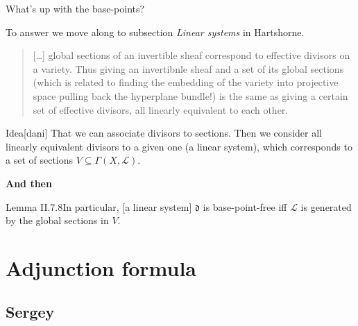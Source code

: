 \begin{question}\leavevmode
What's up with the base-points?
\end{question}

To answer we move along to subsection  \textit{Linear systems} in Hartshorne.
\begin{quotation}
	[…] global sections of an invertible sheaf correspond to effective divisors on a variety. Thus giving an invertibnle sheaf and a set of its global sections {\color{6}(which is related to finding the embedding of the variety into projective space pulling back the hyperplane bundle!)} is the same as giving a certain set of effective divisors, all linearly equivalent to each other.
\end{quotation}

\begin{thing6}{Idea}[dani]\leavevmode
That we can associate divisors to sections. Then we consider all linearly equivalent divisors to a given one (a linear system), which corresponds to a set of sections \(V \subseteq \Gamma(X,\mathcal{L})\).
\end{thing6}

\textbf{And then} 
\begin{thing4}{Lemma II.7.8}\label{lem:II.7.8}\leavevmode
	[…] In particular, [a linear system] \(\mathfrak{d}\) is base-point-free iff \(\mathcal{L}\) is generated by the global sections in \(V\).
\end{thing4}

\section{Adjunction formula}

\subsection{Sergey}

